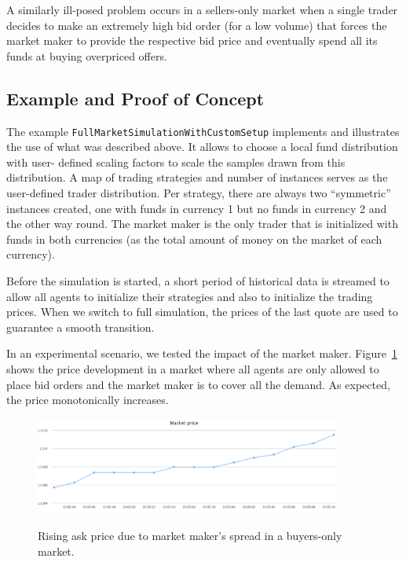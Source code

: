 A similarly ill-posed problem occurs in a sellers-only market when a single trader
decides to make an extremely high bid order (for a low volume) that forces the market
maker to provide the respective bid price and eventually spend all its funds at buying
overpriced offers.

\subsection{Example and Proof of Concept}
The example \texttt{FullMarketSimulationWithCustomSetup} implements and illustrates the 
use of what was described above. It allows to choose a local fund distribution with user-
defined scaling factors to scale the samples drawn from this distribution. A map of trading
strategies and number of instances serves as the user-defined trader distribution. 
Per strategy, there are always two ``symmetric'' instances created, one with funds in 
currency 1 but no funds in currency 2 and the other way round.
The market maker is the only trader that is initialized with funds in both currencies
(as the total amount of money on the market of each currency).

Before the simulation is started, a short period of historical data is streamed to allow
all agents to initialize their strategies and also to initialize the trading prices.
When we switch to full simulation, the prices of the last quote are used to guarantee a
smooth transition.

In an experimental scenario, we tested the impact of the market maker. 
Figure~\ref{fig:mm-sells} shows the price development in a market where all agents are
only allowed to place bid orders and the market maker is to cover all the demand.
As expected, the price monotonically increases.

\begin{figure}[h]
\center
\includegraphics[width=0.9\textwidth]{img/examples/simulation-mad-buys-mm-sells.png} 
\label{fig:mm-sells}
\caption{Rising ask price due to market maker's spread in a buyers-only market.}
\end{figure}

